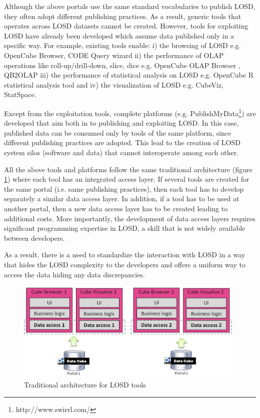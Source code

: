 \documentclass{llncs}
\begin{document}
Although the above portals use the same standard vocabularies to publish LOSD, they often adopt different publishing practices. As a result, generic tools that operates across LOSD datasets cannot be created. However, tools for exploiting LOSD have already been developed which assume data published only in a specific way. For example, existing tools enable: i) the browsing of LOSD e.g. OpenCube Browser\cite{Kalampokis:2014}, CODE Query wizard\cite{CODE:2014} ii) the performance of OLAP operations like roll-up/drill-down, slice, dice e.g. OpenCube OLAP Browser \cite{KalampokisIAOS}, QB2OLAP\cite{QB2OLAP} iii) the performance of  statistical analysis on LOSD e.g. OpenCube R statistical analysis tool\cite{Kalampokis:2014} and iv) the visualization of LOSD e.g. CubeViz\cite{Cubeviz}, StatSpace\cite{Statspace}.

Except from the exploitation tools, complete platforms (e.g. PublishMyData\footnote{http://www.swirrl.com/}) are developed that aim both in to publishing and exploiting LOSD. In this case, published data can be consumed only by tools of the same platform, since different publishing practices are adopted. This lead to the creation of LOSD system silos (software and data) that cannot interoperate among each other.

All the above tools and platforms follow the same traditional architecture (figure \ref{fig:asis}) where each tool has an integrated access layer. If several tools are created for the same portal (i.e. same publishing practices), then each tool has to develop separately  a similar data access layer. In addition, if a tool has to be used at another portal, then a new data access layer has to be created leading to additional costs. More importantly, the development of data access layers requires significant programming expertise in LOSD, a skill that is not widely available between developers.

As a result, there is a need to standardize the interaction with LOSD in a way that hides the LOSD complexity to the developers and offers a uniform way to access the data hiding any data discrepancies. 

\begin{figure}
\begin{center}
  \includegraphics[width=110mm]{images/asis.jpg}
  \end{center}
\caption{Traditional architecture for LOSD tools}
\label{fig:asis}
\end{figure}
\end{document}
